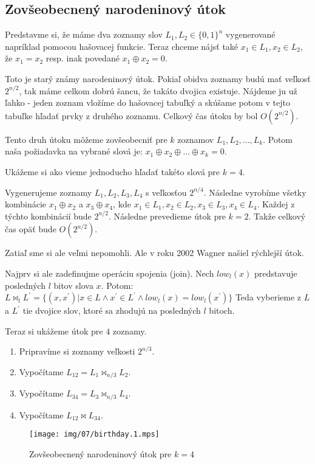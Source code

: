 \subsection{Zovšeobecnený narodeninový útok}

Predstavme si, že máme dva zoznamy slov $L_1, L_2 \in \{0,1\}^n$ vygenerované
napríklad pomocou hašovacej funkcie. Teraz chceme nájsť
také $x_1 \in L_1, x_2 \in L_2$, že $x_1 = x_2$
resp. inak povedané $x_1 \oplus x_2 = 0$.

Toto je starý známy narodeninový útok. Pokiaľ obidva zoznamy budú mať veľkosť
$2^{n/2}$, tak máme celkom dobrú šancu, že takáto dvojica existuje. Nájdeme ju
už ľahko - jeden zoznam vložíme do hašovacej tabuľký a skúšame potom v tejto
tabuľke hľadať prvky z druhého zoznamu.
Celkový čas útoku by bol $O(2^{n/2})$.

Tento druh útoku môžeme zovšeobecniť pre $k$ zoznamov $L_1, L_2, \dots, L_k$.
Potom naša požiadavka na vybrané slová je: $x_1 \oplus x_2 \oplus \dots \oplus x_k = 0$.

Ukážeme si ako vieme jednoducho hľadať takéto slová pre $k=4$.

Vygenerujeme zoznamy $L_1, L_2, L_3, L_4$ s veľkosťou $2^{n/4}$. 
Následne vyrobíme všetky kombinácie $x_1 \oplus x_2$ a $x_3 \oplus x_4$, kde
$x_1 \in L_1, x_2 \in L_2, x_3 \in L_3, x_4 \in L_4$.
Každej z týchto kombinácií bude $2^{n/2}$. Následne prevedieme útok pre $k=2$.
Takže celkový čas opäť bude $O(2^{n/2})$.

Zatiaľ sme si ale veľmi nepomohli. Ale v roku 2002 Wagner \cite{birthday}
našiel rýchlejší útok.

Najprv si ale zadefinujme operáciu spojenia (join). Nech $low_l(x)$ predstavuje
posledných $l$ bitov slova $x$. Potom:
$L \bowtie_l L^{'} = \{(x, x^{'}) | x \in L \land x^{'} \in L^{'} \land low_{l}(x) = low_l(x^{'})\}$
Teda vyberieme z $L$ a $L^{'}$ tie dvojice slov, ktoré sa zhodujú na posledných
$l$ bitoch.

Teraz si ukážeme útok pre $4$ zoznamy. 
\begin{enumerate}
\item Pripravíme si zoznamy veľkosti $2^{n/3}$.
\item Vypočítame $L_{12} = L_1 \bowtie_{n/3} L_2$.
\item Vypočítame $L_{34} = L_3 \bowtie_{n/3} L_4$.
\item Vypočítame $L_{12} \bowtie L_{34}$.
\end{enumerate}

\begin{figure}
    \centering
    \texttt{[image: img/07/birthday.1.mps]}
    \caption{Zovšeobecnený narodeninový útok pre $k = 4$}
\end{figure}


